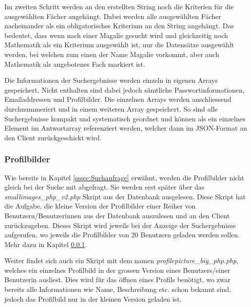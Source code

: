 \documentclass[a4paper,11pt]{report}
\begin{document}
					Im zweiten Schritt werden an den erstellten String noch die Kriterien für die ausgewählten Fächer angehängt. Dabei werden alle ausgewählten Fächer nacheinander als ein obligatorisches Kriterium an den String angehängt. Das bedeutet, dass wenn nach einer \glqq Magalie\grqq{} gesucht wird und gleichzeitig noch Mathematik als ein Kriterium ausgewählt ist, nur die Datensätze ausgewählt werden, bei welchen zum einen der Name \glqq Magalie\grqq{} vorkommt, aber auch Mathematik als angebotenes Fach markiert ist.
					
					Die Informationen der Suchergebnisse werden einzeln in eigenen Arrays gespeichert. Nicht enthalten sind dabei jedoch sämtliche Passwortinformationen, Emailaddressen und Profilbilder. Die einzelnen Arrays werden anschliessend durchnummeriert und in einem weiteren Array gespeichert. So sind alle Suchergebnisse kompakt und systematisch geordnet und können als ein einzelnes Element im Antwortarray referenziert werden, welcher dann im JSON-Format an den Client zurückgeschickt wird.
					
					\subsubsection{Profilbilder} %
					Wie bereits in Kapitel \ref{sssec:Suchanfrage} erwähnt, werden die Profilbilder nicht gleich bei der Suche mit abgefragt. Sie werden erst später über das \emph{smallimages\_php\_v2.php} Skript aus der Datenbank ausgelesen. Diese Skript hat die Aufgabe, die kleine Version der Profilbilder einer Reiher von Benutzern/Benutzerinnen aus der Datenbank auszulesen und an den Client zurückzugeben. Dieses Skript wird jeweils bei der Anzeige der Suchergebnisse aufgerufen, wo jeweils die Profilbilder von 20 Benutzern geladen werden sollen. Mehr dazu in Kapitel \ref{}.
					
					Weiter findet sich auch ein Skript mit dem namen \emph{profilepicture\_big\_php.php}, welches ein einzelnes Profilbild  in der grossen Version eines Benutzers/einer Benutzerin ausliest. Dies wird für das öffnen eines Profils benötigt, wo zwar bereits alle Informationen wie Name, Beschreibung etc. schon bekannt sind, jedoch das Profilbild nur in der kleinen Version geladen ist. 
					 
					
\end{document}
